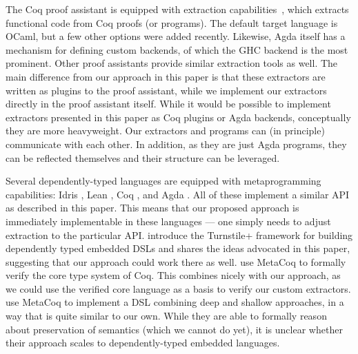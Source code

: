 \documentclass[sigplan,screen]{acmart}
\begin{document}
The Coq proof assistant is equipped with extraction
capabilities~\cite{10.1007/978-3-540-69407-6_39,10.1007/3-540-39185-1_12},
which extracts functional code from Coq proofs (or programs).  The
default target language is OCaml, but a few other options were added
recently.
%
Likewise, Agda itself has a mechanism for defining custom backends, of
which the GHC backend is the most prominent.
%
Other proof assistants provide similar extraction tools as well.
%
The main difference from our approach in this paper
is that these extractors are written as plugins to the proof
assistant, while we implement our extractors directly in the proof
assistant itself.
%
While it would be possible to implement extractors presented in this
paper as Coq plugins or Agda backends, conceptually they are more
heavyweight.  Our extractors and programs can (in principle)
communicate with each other. In addition, as they are just Agda programs, they can
be reflected themselves and their structure can be leveraged.


Several dependently-typed languages are equipped with metaprogramming
capabilities: Idris \cite{idris-refl}, Lean \cite{lean-refl},
Coq \cite{metacoq}, and Agda \cite{agda-refl}.  All of these
implement a similar API as described in this paper.  This
means that our proposed approach is immediately implementable
in these languages --- one simply needs to adjust extraction
to the particular API.
\citet{10.1145/3371071} introduce the Turnstile+ framework for
building dependently typed embedded DSLs and
shares the ideas advocated in this paper, suggesting that
our approach could work there as well.
\citet{10.1145/3371076} use MetaCoq to formally verify
the core type system of Coq. This combines nicely with
our approach, as we could use the verified core language
as a basis to verify our custom extractors.
\citet{10.1145/3372885.3373829} use MetaCoq to implement
a DSL combining deep and shallow approaches, in a way that
is quite similar to our own. While they are able to formally
reason about preservation of semantics (which we cannot do yet), it is unclear
whether their approach scales to dependently-typed embedded languages.
\end{document}
